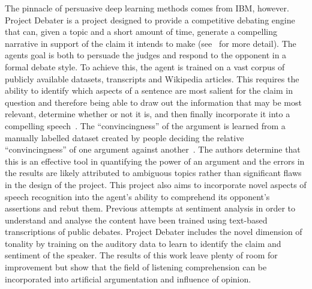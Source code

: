 The pinnacle of persuasive deep learning methods comes from IBM, however. Project Debater is a project designed to provide a competitive debating engine that can, given a topic and a short amount of time, generate a compelling narrative in support of the claim it intends to make (see~\cite{Hou2017ArgumentModel, MassWordSpeech} for more detail). The agents goal is both to persuade the judges and respond to the opponent in a formal debate style. To achieve this, the agent is trained on a vast corpus of publicly available datasets, transcripts and Wikipedia articles. This requires the ability to identify which aspects of a sentence are most salient for the claim in question and therefore being able to draw out the information that may be most relevant, determine whether or not it is, and then finally incorporate it into a compelling speech~\cite{Levy2018TowardsSupervision}. The ``convincingness'' of the argument is learned from a manually labelled dataset created by people deciding the relative ``convincingness'' of one argument against another~\cite{Habernal2016WhichLSTM}. The authors determine that this is an effective tool in quantifying the power of an argument and the errors in the results are likely attributed to ambiguous topics rather than significant flaws in the design of the project. This project also aims to incorporate novel aspects of speech recognition into the agent's ability to comprehend its opponent's assertions and rebut them. Previous attempts at sentiment analysis in order to understand and analyse the content have been trained using text-based transcriptions of public debates. Project Debater includes the novel dimension of tonality by training on the auditory data to learn to identify the claim and sentiment of the speaker. The results of this work leave plenty of room for improvement but show that the field of listening comprehension can be incorporated into artificial argumentation and influence of opinion.

